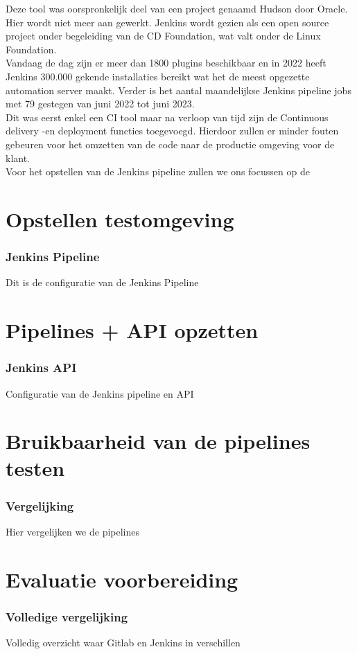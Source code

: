 Deze tool was oorspronkelijk deel van een project genaamd Hudson door Oracle. Hier wordt niet meer aan gewerkt. Jenkins wordt gezien als een open source project onder begeleiding van de CD Foundation, wat valt onder de Linux Foundation. \autocite{Riglian2019} \\
Vandaag de dag zijn er meer dan 1800 plugins beschikbaar en in 2022 heeft Jenkins 300.000 gekende installaties bereikt wat het de meest opgezette automation server maakt. Verder is het aantal maandelijkse Jenkins pipeline jobs met 79 gestegen van juni 2022 tot juni 2023.  \autocite{CdFoundation2023} \\
Dit was eerst enkel een CI tool maar na verloop van tijd zijn de Continuous delivery -en deployment functies toegevoegd. Hierdoor zullen er minder fouten gebeuren voor het omzetten van de code naar de productie omgeving voor de klant. \autocite{Riglian2019} \\

Voor het opstellen van de Jenkins pipeline zullen we ons focussen op de


\part{Opstellen testomgeving}
\section{Jenkins Pipeline}
Dit is de configuratie van de Jenkins Pipeline


\part{Pipelines + API opzetten}
\section{Jenkins API}
Configuratie van de Jenkins pipeline en API

\part{Bruikbaarheid van de pipelines testen}
\section{Vergelijking}
Hier vergelijken we de pipelines


\part{Evaluatie voorbereiding}
\section{Volledige vergelijking}
Volledig overzicht waar Gitlab en Jenkins in verschillen    
